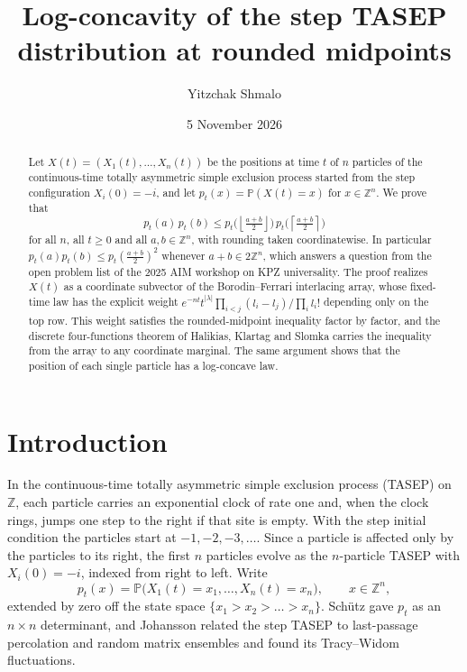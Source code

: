 \documentclass[11pt]{amsart}
\title{Log-concavity of the step TASEP distribution at rounded midpoints}
\author{Yitzchak Shmalo}
\date{5 November 2026}
\theoremstyle{remark}
\numberwithin{equation}{section}
\newcommand{\Pp}{\mathbb P}
\newcommand{\1}{\mathbf 1}
\newcommand{\Z}{\mathbb Z}
\newcommand{\fl}[1]{\left\lfloor #1\right\rfloor}
\newcommand{\cl}[1]{\left\lceil #1\right\rceil}
\begin{document}
\begin{abstract}
Let $X(t)=(X_1(t),\dots,X_n(t))$ be the positions at time $t$ of $n$ particles of the continuous-time totally asymmetric simple exclusion process started from the step configuration $X_i(0)=-i$, and let $p_t(x)=\Pp(X(t)=x)$ for $x\in\Z^n$. We prove that
\[
p_t(a)\,p_t(b)\le p_t\bigl(\fl{\tfrac{a+b}2}\bigr)\,p_t\bigl(\cl{\tfrac{a+b}2}\bigr)
\]
for all $n$, all $t\ge0$ and all $a,b\in\Z^n$, with rounding taken coordinatewise. In particular $p_t(a)p_t(b)\le p_t(\tfrac{a+b}2)^2$ whenever $a+b\in2\Z^n$, which answers a question from the open problem list of the 2025 AIM workshop on KPZ universality. The proof realizes $X(t)$ as a coordinate subvector of the Borodin--Ferrari interlacing array, whose fixed-time law has the explicit weight $e^{-nt}t^{|\lambda|}\prod_{i<j}(l_i-l_j)/\prod_i l_i!$ depending only on the top row. This weight satisfies the rounded-midpoint inequality factor by factor, and the discrete four-functions theorem of Halikias, Klartag and Slomka carries the inequality from the array to any coordinate marginal. The same argument shows that the position of each single particle has a log-concave law.
\end{abstract}
\maketitle

\section{Introduction}\label{sec:intro}

In the continuous-time totally asymmetric simple exclusion process (TASEP) on $\Z$, each particle carries an exponential clock of rate one and, when the clock rings, jumps one step to the right if that site is empty. With the step initial condition the particles start at $-1,-2,-3,\dots$. Since a particle is affected only by the particles to its right, the first $n$ particles evolve as the $n$-particle TASEP with $X_i(0)=-i$, indexed from right to left. Write
\[
p_t(x)=\Pp\bigl(X_1(t)=x_1,\dots,X_n(t)=x_n\bigr),\qquad x\in\Z^n,
\]
extended by zero off the state space $\{x_1>x_2>\dots>x_n\}$. Sch\"utz \cite{Sch} gave $p_t$ as an $n\times n$ determinant, and Johansson \cite{Joh} related the step TASEP to last-passage percolation and random matrix ensembles and found its Tracy--Widom fluctuations.
\end{document}
